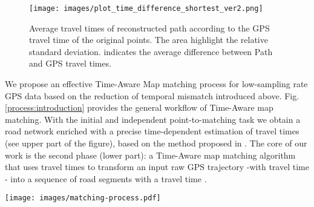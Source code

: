 \documentclass[5p]{elsarticle}
\begin{document}
\begin{figure}[h!]

\centering
\texttt{[image: images/plot\_time\_difference\_shortest\_ver2.png]}
\caption{Average travel times of reconstructed path according to the GPS travel time of the original points. The area highlight the relative standard deviation.  indicates the average difference between Path and
GPS travel times.
}
\label{plot_difference}
\end{figure}

We propose an effective Time-Aware Map matching process for low-sampling rate GPS data based on the reduction of temporal mismatch introduced above. Fig. \ref{process:introduction} provides
the general workflow of Time-Aware map matching. With the initial and independent point-to-matching task  we obtain a road network enriched with a precise time-dependent estimation of
travel times (see upper part of the figure), based on the method proposed in \cite{cintia2013gravity}. The core of our work is the second phase (lower part): a Time-Aware map matching algorithm that uses travel times to transform an input raw GPS trajectory -with travel time - into a 
sequence of road segments with a travel time . 
\begin{figure*}[t!]

\centering
\texttt{[image: images/matching-process.pdf]}
\caption{A graphical representation of Time-Aware map-matching process }
\label{process:introduction}
\end{figure*}
\end{document}
